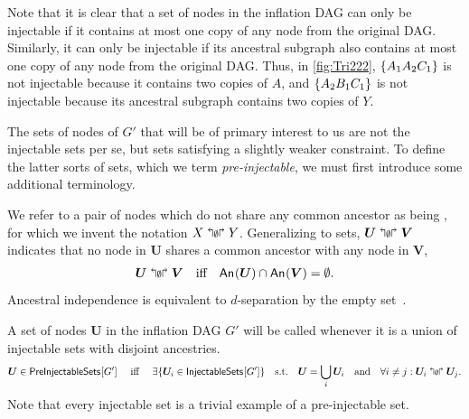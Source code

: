 Note that it is clear that a set of nodes in the inflation DAG can only be injectable if it contains at most one copy of any node from the original DAG.  Similarly, it can only be injectable if its ancestral subgraph also contains at most one copy of any node from the original DAG.  
Thus, in \cref{fig:Tri222}, $\left\lbrace A_1 A_2 C_1\right\rbrace$ is not injectable because it contains two copies of $A$, and $\left\lbrace A_2 B_1 C_1\right\rbrace$ is not injectable because its ancestral subgraph contains two copies of $Y$. 

The sets of nodes of $G'$ that will be of primary interest to us are not the injectable sets per se, but sets satisfying a slightly weaker constraint.
To define the latter sorts of sets, which we term {\em pre-injectable}, we must first introduce some additional terminology. 

We refer to a pair of nodes which do not share any common ancestor as being , for which we invent the notation $X\mathrel{\mathopen{\Lsh}{\scriptstyle\emptyset}\mathclose{\Rsh}} Y$. Generalizing to sets, $\bm{U}\mathrel{\mathopen{\Lsh}{\scriptstyle\emptyset}\mathclose{\Rsh}} \bm{V}$ indicates that no node in $\bm{U}$ shares a common ancestor with any node in $\bm{V}$, 
\begin{align}
\bm{U}\mathrel{\mathopen{\Lsh}{\scriptstyle\emptyset}\mathclose{\Rsh}} \bm{V} \quad \text{iff} \quad {\mathsf{An}_{}}\lparen\bm{U}\rparen\cap{\mathsf{An}_{}}\lparen\bm{V}\rparen=\emptyset.
\end{align}
Ancestral independence is equivalent to $d$-separation by the empty set~\cite{pearl2009causality,spirtes2011causation,studeny2005probabilistic,koller2009probabilistic}. 


A set of nodes $\bm{U}$ in the inflation DAG $G'$ will be called  whenever it is a union of injectable sets with disjoint ancestries. 
\begin{align}\label{eq:defpreinj}
\bm{U}\in{\operatorname{\mathsf{PreInjectableSets}}_{}}\lbrack G'\rbrack \quad\text{ iff }\quad  \exists \{ \bm{U}_i \in {\operatorname{\mathsf{InjectableSets}}_{}}\lbrack G'\rbrack \} \quad \text{s.t.}\quad \bm{U}=\bigcup_i \bm{U}_i  \quad\text{and} \quad  \forall i\ne j: \bm{U}_i \mathrel{\mathopen{\Lsh}{\scriptstyle\emptyset}\mathclose{\Rsh}} \bm{U}_j.
\end{align}
Note that every injectable set is a trivial example of a pre-injectable set.

